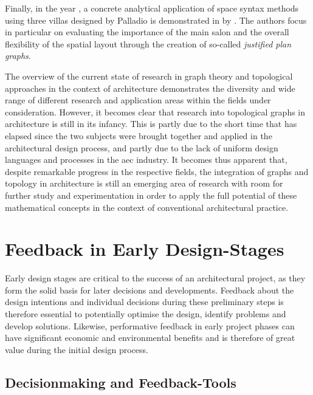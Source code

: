 \documentclass[a4paper, 12pt]{report}
\begin{document}
Finally, in the year \citeyear{dawes2021examining}, a concrete analytical application of space syntax methods using three villas designed by Palladio is demonstrated in  by \citeauthor{dawes2021examining}. The authors focus in particular on evaluating the importance of the main salon and the overall flexibility of the spatial layout through the creation of so-called \textit{justified plan graphs}.

The overview of the current state of research in graph theory and topological approaches in the context of architecture demonstrates the diversity and wide range of different research and application areas within the fields under consideration. However, it becomes clear that research into topological graphs in architecture is still in its infancy. This is partly due to the short time that has elapsed since the two subjects were brought together and applied in the architectural design process, and partly due to the lack of uniform design languages and processes in the \acrshort{aec} industry. It becomes thus apparent that, despite remarkable progress in the respective fields, the integration of graphs and topology in architecture is still an emerging area of research with room for further study and experimentation in order to apply the full potential of these mathematical concepts in the context of conventional architectural practice.

\section{Feedback in Early Design-Stages}\label{sec:feedback-in-early-design-stages}

Early design stages are critical to the success of an architectural project, as they form the solid basis for later decisions and developments. Feedback about the design intentions and individual decisions during these preliminary steps is therefore essential to potentially optimise the design, identify problems and develop solutions. Likewise, performative feedback in early project phases can have significant economic and environmental benefits and is therefore of great value during the initial design process.

\subsection{Decisionmaking and Feedback-Tools}\label{subsec:decisionmaking-and-feedback-tools}
\end{document}

